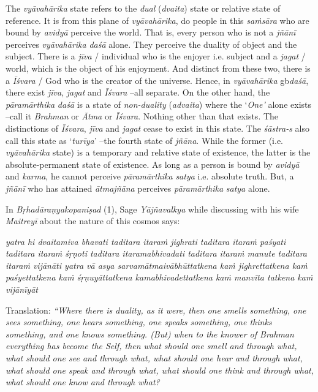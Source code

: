 The \emph{vyāvahārika} state refers to the \emph{dual} (\emph{dvaita}) state or relative state of reference. It is from this plane of \emph{vyāvahārika}, do people in this \emph{saṁsāra} who are bound by \emph{avidyā} perceive the world. That is, every person who is not a \emph{jñānī} perceives \emph{vyāvahārika} \emph{daśā} alone. They perceive the duality of object and the subject. There is a \emph{jīva} / individual who is the enjoyer i.e. subject and a \emph{jagat} / world, which is the object of his enjoyment. And distinct from these two, there is a \emph{Īśvara} / God who is the creator of the universe. Hence, in \emph{vyāvahārika} gb\emph{daśā}, there exist \emph{jīva}, \emph{jagat} and \emph{Īśvara} --all separate. On the other hand, the \emph{pāramārthika} \emph{daśā} is a state of \emph{non-duality} (\emph{advaita}) where the `\emph{One'} alone exists --call it \emph{Brahman} or \emph{Ātma} or \emph{Īśvara}. Nothing other than that exists. The distinctions of \emph{Īśvara}, \emph{jīva} and \emph{jagat} cease to exist in this state. The \emph{śāstra-s} also call this state as `\emph{turīya}' --the fourth state of \emph{jñāna}. While the former (i.e. \emph{vyāvahārika} state) is a temporary and relative state of existence, the latter is the absolute-permanent state of existence. As long as a person is bound by \emph{avidyā} and \emph{karma}, he cannot perceive \emph{pāramārthika} \emph{satya} i.e. absolute truth. But, a \emph{jñānī} who has attained \emph{ātmajñāna} perceives \emph{pāramārthika} \emph{satya} alone.

In \emph{Bṛhadāraṇyakopaniṣad} (1), Sage \emph{Yājñavalkya} while discussing with his wife \emph{Maitreyī} about the nature of this cosmos says:

\emph{yatra hi dvaitamiva bhavati taditara itaraṁ jighrati taditara itaraṁ paśyati taditara itaraṁ śṛṇoti taditara itaramabhivadati taditara itaraṁ manute taditara itaraṁ vijānāti yatra vā asya sarvamātmaivābhūttatkena kaṁ jighrettatkena kaṁ paśyettatkena kaṁ śṛṇuyāttatkena kamabhivadettatkena kaṁ manvīta tatkena kaṁ vijānīyāt} 

Translation: \emph{``Where there is duality, as it were, then one smells something, one sees something, one hears something, one speaks something, one thinks something, and one knows something. (But) when to the knower of Brahman everything has become the Self, then what should one smell and through what, what should one see and through what, what should one hear and through what, what should one speak and through what, what should one think and through what, what should one know and through what?}


